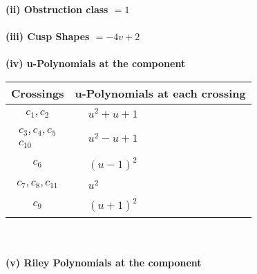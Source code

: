 \documentclass[1p]{elsarticle_modified}
\theoremstyle{definition}
\begin{document}
\flushleft \textbf{(ii) Obstruction class $= 1$}\\~\\
\flushleft \textbf{(iii) Cusp Shapes $= -4 v+2$}\\~\\
\newpage\renewcommand{\arraystretch}{1}
\flushleft \textbf{(iv) u-Polynomials at the component}\newline \\
\begin{tabular}{m{50pt}|m{274pt}}
Crossings & \hspace{64pt}u-Polynomials at each crossing \\
\hline $$\begin{aligned}c_{1},c_{2}\end{aligned}$$&$\begin{aligned}
&u^2+u+1
\end{aligned}$\\
\hline $$\begin{aligned}c_{3},c_{4},c_{5}\\c_{10}\end{aligned}$$&$\begin{aligned}
&u^2- u+1
\end{aligned}$\\
\hline $$\begin{aligned}c_{6}\end{aligned}$$&$\begin{aligned}
&(u-1)^2
\end{aligned}$\\
\hline $$\begin{aligned}c_{7},c_{8},c_{11}\end{aligned}$$&$\begin{aligned}
&u^2
\end{aligned}$\\
\hline $$\begin{aligned}c_{9}\end{aligned}$$&$\begin{aligned}
&(u+1)^2
\end{aligned}$\\
\hline
\end{tabular}\\~\\
\newpage\renewcommand{\arraystretch}{1}
\flushleft \textbf{(v) Riley Polynomials at the component}\newline \\
\end{document}
